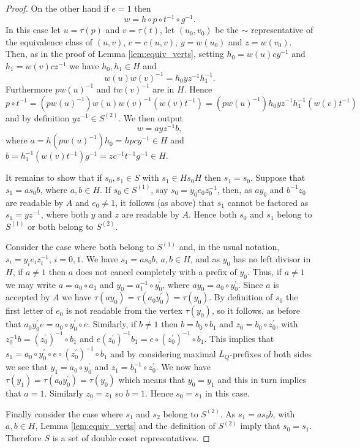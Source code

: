 \documentclass[a4paper,12pt]{article}
\renewcommand{\t}{\tau }
\numberwithin{equation}{section}
\numberwithin{figure}{section}
\begin{document}
\begin{proof}
On the other hand if $e=1$ then
\[w=h\circ p\circ t^{-1}\circ g^{-1}.\]
In this case let $u=\t(p)$ and $v=\t(t)$,
let $(u_0,v_0)$ be the $\sim$ representative
of the equivalence class of $(u,v)$, $c=c(u,v)$, 
 $y=w(u_0)$ and $z=w(v_0)$. Then,  as in the proof of Lemma
\ref{lem:equiv_verts}, setting $h_0=w(u)cy^{-1}$ and
$h_1=w(v)cz^{-1}$ we have
 $h_0,h_1\in H$ and
\[w(u)w(v)^{-1}=h_0yz^{-1}h_1^{-1}.\] Furthermore
 $p w(u)^{-1}$ and  $t w(v)^{-1}$ are in $H$. Hence
\[
p\circ t^{-1}=( p w(u)^{-1})w(u)w(v)^{-1}( w(v)t^{-1})=( p w(u)^{-1}) h_0 yz^{-1}
h_1^{-1}( w(v)t^{-1})
\]
and by definition $yz^{-1}\in S^{(2)}$. We then output
\[w=a yz^{-1} b,\]
where $a=h ( p w(u)^{-1}) h_0=hpcy^{-1}\in H$ and $b=h_1^{-1}( w(v)t^{-1})g^{-1} 
=zc^{-1}t^{-1}g^{-1}\in H$.

It remains to show that if $s_0,s_1\in S$ with $s_1\in Hs_0H$
then $s_1=s_0$. Suppose that $s_1=as_0b$, where $a, b\in H$. If
$s_0\in S^{(1)}$, say $s_0=y_0e_0z_0^{-1}$, then, as $ay_0$ and
$b^{-1}z_0$ are readable by $A$ and $e_0\neq 1$, it follows (as
above) that $s_1$ cannot be factored as $s_1=yz^{-1}$, where both
$y$ and $z$ are readable by $A$. Hence both $s_0$ and $s_1$ belong
to $S^{(1)}$ or both belong to $S^{(2)}$.

Consider the case where both belong to $S^{(1)}$ and, in the usual notation,
$s_i=y_i e_i z_i^{-1}$, $i=0,1$. We have $s_1=as_0b$, $a,b\in H$, and as $y_0$ has
no left divisor in $H$, if $a\neq 1$ then $a$ does not cancel completely with
 a prefix of $y_0$. Thus, if $a\neq 1$ we may write $a=a_0\circ a_1$ and
$y_0=a_1^{-1}\circ y_0^\prime$, where $ay_0=a_0\circ y_0^\prime$. Since
$a$ is accepted by $A$ we have $\t(ay_0)=\t(a_0y_0^\prime)=\t(y_0)$. By definition
of $s_0$ the first letter of $e_0$ is not readable from the vertex $\t(y_0)$, so
it follows, as before that $a_0y_0^\prime e=a_0\circ y_0^\prime \circ e$. Similarly,
if $b\neq 1$ then $b=b_0\circ b_1$ and $z_0=b_0\circ z_0^\prime$, with
$z_0^{-1}b= (z_0^\prime)^{-1}\circ b_1$ and $e (z_0^\prime)^{-1}b_1=
e\circ  (z_0^\prime)^{-1}\circ b_1$. This implies that
$s_1=a_0\circ y_0^\prime \circ  e\circ  (z_0^\prime)^{-1}\circ b_1$ and by considering
maximal $L_Q$-prefixes of both sides we see that $y_1=a_0\circ y_0^\prime$ and
$z_1=b_1^{-1}\circ z_0^\prime$. We now have  $\t(y_1)=\t(a_0y_0^\prime)=\t(y_0)$ which
 means that
$y_0=y_1$ and this in turn implies that $a=1$. Similarly $z_0=z_1$ so $b=1$.
Hence $s_0=s_1$ in this case.

Finally consider the case where $s_1$ and $s_2$ belong to
$S^{(2)}$. As $s_1=as_0b$, with $a,b\in H$, Lemma
\ref{lem:equiv_verts} and the definition of $S^{(2)}$ imply  that
$s_0= s_1$. Therefore $S$ is a set of double coset
representatives.
\end{proof}
\end{document}
